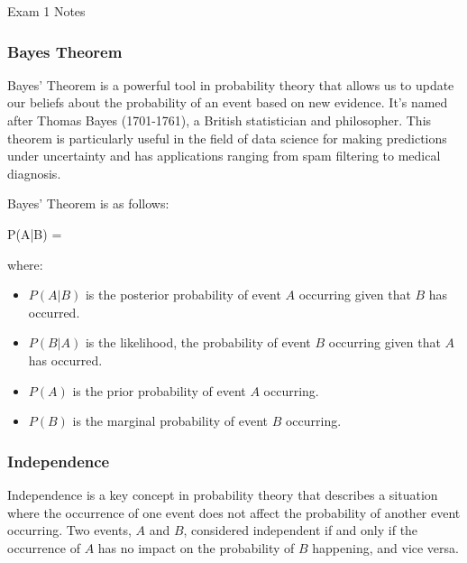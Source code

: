 \begin{examnotes}{Exam 1 Notes}
    \subsubsection*{Bayes Theorem}

    Bayes' Theorem is a powerful tool in probability theory that allows us to update our beliefs about the probability of an event based on new evidence. It's named after Thomas Bayes (1701-1761), a 
    British statistician and philosopher. This theorem is particularly useful in the field of data science for making predictions under uncertainty and has applications ranging from spam filtering 
    to medical diagnosis.

    Bayes' Theorem is as follows:
    \begin{center}
        \begin{highlightbox}
            P(A|B) = 
        \end{highlightbox}
    \end{center}
    where:
    \begin{itemize}
        \item $P(A|B)$ is the posterior probability of event $A$ occurring given that $B$ has occurred.
        \item $P(B|A)$ is the likelihood, the probability of event $B$ occurring given that $A$ has occurred.
        \item $P(A)$ is the prior probability of event $A$ occurring.
        \item $P(B)$ is the marginal probability of event $B$ occurring.
    \end{itemize}

    \subsubsection*{Independence}

    Independence is a key concept in probability theory that describes a situation where the occurrence of one event does not affect the probability of another event occurring. Two events, $A$ and $B$,
    considered independent if and only if the occurrence of $A$ has no impact on the probability of $B$ happening, and vice versa.


\end{examnotes}
